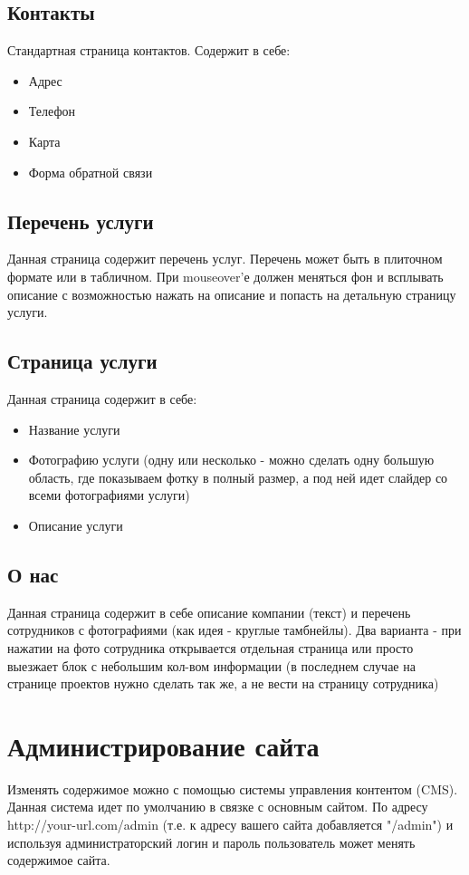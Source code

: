 \documentclass[DIV=calc, paper=a4, fontsize=11pt]{scrartcl} %
\begin{document}
\subsection{Контакты}

Стандартная страница контактов. Содержит в себе:

\begin{itemize}
	\item Адрес
	\item Телефон
	\item Карта
	\item Форма обратной связи
\end{itemize}

\subsection{Перечень услуги}
Данная страница содержит перечень услуг. Перечень может быть в плиточном формате или в табличном. При mouseover'е должен меняться фон и всплывать описание с возможностью нажать на описание и попасть на детальную страницу услуги.

\subsection{Страница услуги}
Данная страница содержит в себе:
\begin{itemize}
	\item Название услуги
	\item Фотографию услуги (одну или несколько - можно сделать одну большую область, где показываем фотку в полный размер, а под ней идет слайдер со всеми фотографиями услуги)
	\item Описание услуги
\end{itemize}

\subsection{О нас}
Данная страница содержит в себе описание компании (текст) и перечень сотрудников с фотографиями (как идея - круглые тамбнейлы). Два варианта - при нажатии на фото сотрудника открывается отдельная страница или просто выезжает блок с небольшим кол-вом информации (в последнем случае на странице проектов нужно сделать так же, а не вести на страницу сотрудника)

\section{Администрирование сайта}
Изменять содержимое можно с помощью системы управления контентом (CMS). Данная система идет по умолчанию в связке с основным сайтом. По адресу http://your-url.com/admin (т.е. к адресу вашего сайта добавляется "/admin") и используя администраторский логин и пароль пользователь может менять содержимое сайта.
\end{document}
